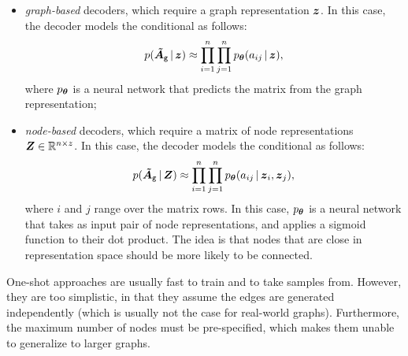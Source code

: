 \begin{itemize}
    \item \emph{graph-based} decoders, which require a graph representation $\Vector{z}$. In this case, the decoder models the conditional as follows:
    $$p(\ProbAdjMatrix{g} \given \Vector{z}) \approx \prod_{i=1}^n \prod_{j=1}^n p_{\Param}(a_{ij} \given \Vector{z}),$$
    where $p_{\boldsymbol{\theta}}$ is a neural network that predicts the matrix from the graph representation;
    \item \emph{node-based} decoders, which require a matrix of node representations $\Matrix{Z} \in \Real^{n \times z}$. In this case, the decoder models the conditional as follows:
    $$p(\ProbAdjMatrix{g} \given \Matrix{z}) \approx \prod_{i=1}^n \prod_{j=1}^n p_{\Param}(a_{ij} \given \Vector{z}_i, \Vector{z}_j),$$
    where $i$ and $j$ range over the matrix rows. In this case, $p_{\boldsymbol{\theta}}$ is a neural network that takes as input pair of node representations, and applies a sigmoid function to their dot product. The idea is that nodes that are close in representation space should be more likely to be connected.
\end{itemize}
One-shot approaches are usually fast to train and to take samples from. However, they are too simplistic, in that they assume the edges are generated independently (which is usually not the case for real-world graphs). Furthermore, the maximum number of nodes must be pre-specified, which makes them unable to generalize to larger graphs.

